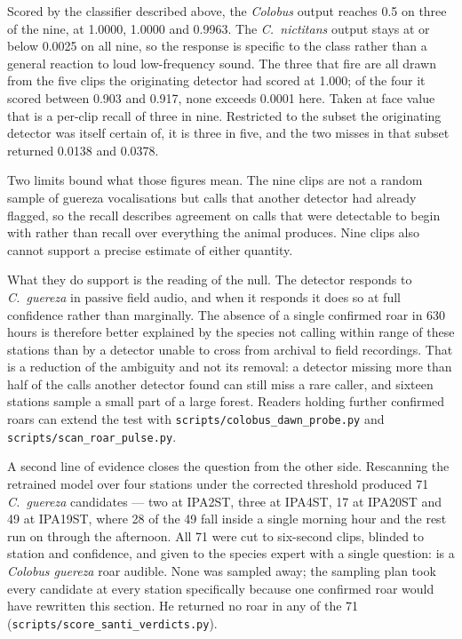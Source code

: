 \documentclass[review,3p,times]{elsarticle}
\begin{document}
Scored by the classifier described above, the \textit{Colobus} output reaches
0.5 on three of the nine, at 1.0000, 1.0000 and 0.9963. The \textit{C.\
nictitans} output stays at or below 0.0025 on all nine, so the response is
specific to the class rather than a general reaction to loud low-frequency
sound. The three that fire are all drawn from the five clips the originating
detector had scored at 1.000; of the four it scored between 0.903 and 0.917,
none exceeds 0.0001 here. Taken at face value that is a per-clip recall of three
in nine. Restricted to the subset the originating detector was itself certain
of, it is three in five, and the two misses in that subset returned 0.0138 and
0.0378.

Two limits bound what those figures mean. The nine clips are not a random sample
of guereza vocalisations but calls that another detector had already flagged, so
the recall describes agreement on calls that were detectable to begin with
rather than recall over everything the animal produces. Nine clips also cannot
support a precise estimate of either quantity.

What they do support is the reading of the null. The detector responds to
\textit{C.\ guereza} in passive field audio, and when it responds it does so at
full confidence rather than marginally. The absence of a single confirmed roar
in 630 hours is therefore better explained by the species not calling within
range of these stations than by a detector unable to cross from archival to
field recordings. That is a reduction of the ambiguity and not its removal: a
detector missing more than half of the calls another detector found can still
miss a rare caller, and sixteen stations sample a small part of a large forest.
Readers holding further confirmed roars can extend the test with
\texttt{scripts/colobus\_dawn\_probe.py} and
\texttt{scripts/scan\_roar\_pulse.py}.

A second line of evidence closes the question from the other side. Rescanning
the retrained model over four stations under the corrected threshold produced 71
\textit{C.\ guereza} candidates --- two at IPA2ST, three at IPA4ST, 17 at
IPA20ST and 49 at IPA19ST, where 28 of the 49 fall inside a single morning hour
and the rest run on through the afternoon. All 71 were cut to six-second clips,
blinded to station and
confidence, and given to the species expert with a single question: is a
\textit{Colobus guereza} roar audible. None was sampled away; the sampling plan
took every candidate at every station specifically because one confirmed roar
would have rewritten this section. He returned no roar in any of the 71
(\texttt{scripts/score\_santi\_verdicts.py}).
\end{document}
